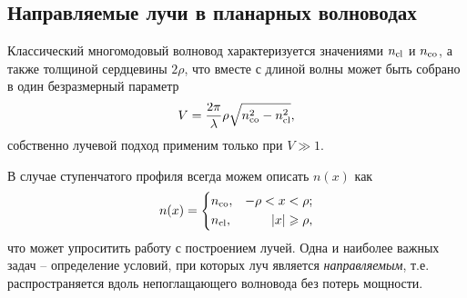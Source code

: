 \subsection{Направляемые лучи в планарных волноводах}

Классический многомодовый волновод характеризуется значениями $n_{\textnormal{cl}}$ и $n_{\textnormal{co}}$, а также толщиной сердцевины $2 \rho$, что вместе с длиной волны может быть собрано в один безразмерный параметр
\begin{equation*}
    V = \frac{2\pi}{\lambda} \rho \sqrt{n_{\textnormal{co}}^2 - n_{\textnormal{cl}}^2},
\end{equation*}
собственно лучевой подход применим только  при $V \gg 1$. 


В случае ступенчатого профиля всегда можем описать $n(x)$ как
\begin{equation*}
    n(x) = \left\{\begin{aligned}
        &n_{\textnormal{co}}, &-\rho < x < \rho; \\
        &n_{\textnormal{cl}}, &|x| \geqslant \rho,
    \end{aligned}\right.
\end{equation*}
что может упроситить работу с построением лучей. Одна и наиболее важных задач -- определение условий, при которых луч является \textit{направляемым}, т.е. распространяется вдоль непоглащающего волновода без потерь мощности. 





